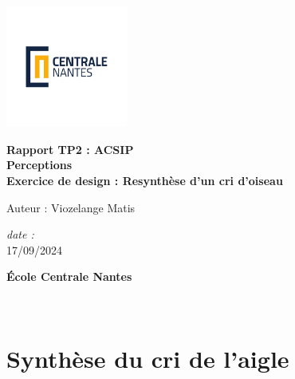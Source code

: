 \documentclass[12pt]{report}
\begin{document}
\renewcommand{\labelenumii}{\arabic{enumi}.\arabic{enumii}}

\begin{titlepage}
    \centering
    \vspace*{0cm}
    \includegraphics[width=0.3\textwidth]{imgs/LogoCN_Q.pdf}
    
    \vspace{3cm}
    
    \Huge\textbf{Rapport TP2 : ACSIP}\\
    \vspace{1cm}
    \Large\textbf{Perceptions}\\
    
    \vspace{2cm}
    \Large\textbf{Exercice de design : Resynthèse d’un cri d’oiseau }\\
    
    \vfill
    
    \Large{Auteur : Viozelange Matis}\\
    \vspace{0.5cm}
    
    \vfill

    \vspace{2cm}
    
    \Large\textit{date :}\\
    \Large\textit{}{17/09/2024}\\
    
    \vspace{0.5cm}
    
    \Large\textbf{École Centrale Nantes}\\
    
    \vspace*{1cm}
\end{titlepage}


\newpage
\thispagestyle{empty}
~

\chapter{Synthèse du cri de l'aigle}
\end{document}
